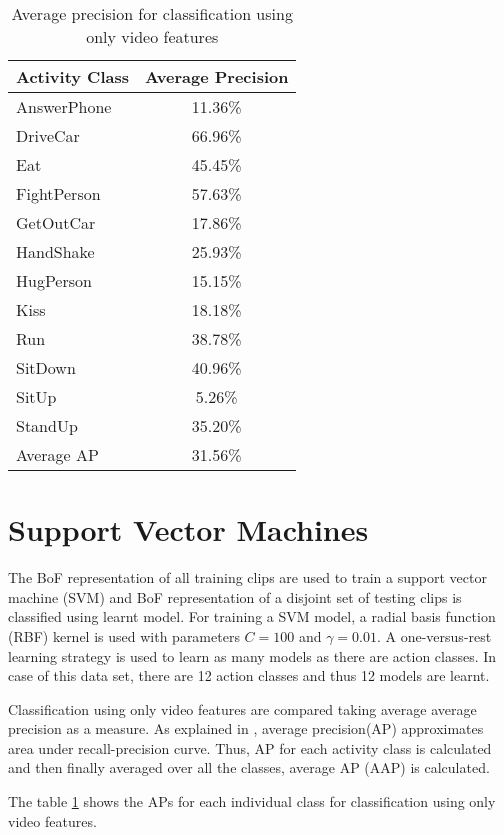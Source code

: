 \begin{table}[t]
\centering
\begin{tabular}{| l | c |}
\hline
{\bf Activity Class} & {\bf Average Precision} \\ \hline
%
AnswerPhone & 11.36\% \\ \hline
DriveCar & 66.96\% \\ \hline
Eat & 45.45\% \\ \hline
FightPerson & 57.63\% \\ \hline
GetOutCar & 17.86\% \\ \hline
HandShake & 25.93\% \\ \hline
HugPerson & 15.15\% \\ \hline
Kiss & 18.18\% \\ \hline
Run & 38.78\% \\ \hline
SitDown & 40.96\% \\ \hline
SitUp & 5.26\% \\ \hline
StandUp & 35.20\% \\ \hline
Average AP & 31.56\% \\ \hline
%
\end{tabular}
\caption{Average precision for classification using only video features}
\label{table:AP_OnlyAction}
\end{table}


\section{Support Vector Machines}
The BoF representation of all training clips are used to train a
support vector machine (SVM) and BoF representation of a disjoint set of testing clips is classified using
learnt model. For training a SVM model, a radial basis function (RBF) kernel is used with parameters $C = 100$ 
and $\gamma = 0.01$. A one-versus-rest learning strategy is used to learn as many models as there are action classes.
In case of this data set, there are 12 action classes and thus 12 models are learnt.

Classification using only video features are compared taking  average average precision as a measure.
As explained in \cite{actionsInContext}, average precision(AP) approximates area under recall-precision curve.
Thus, AP for each activity class is calculated and then finally averaged over all the classes, average AP (AAP) is calculated.

The table \ref{table:AP_OnlyAction} shows the APs for each individual class for classification using only video features.

